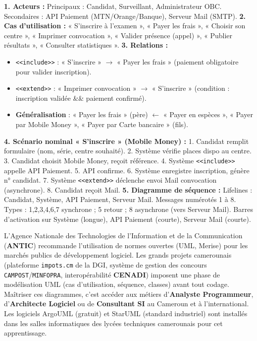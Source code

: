 \documentclass[11pt]{article}
\begin{document}
\begin{corrige}
\textbf{1. Acteurs :} Principaux : Candidat, Surveillant, Administrateur OBC. Secondaires : API Paiement (MTN/Orange/Banque), Serveur Mail (SMTP).
\textbf{2. Cas d'utilisation :} « S'inscrire à l'examen », « Payer les frais », « Choisir son centre », « Imprimer convocation », « Valider présence (appel) », « Publier résultats », « Consulter statistiques ».
\textbf{3. Relations :}
\begin{itemize}
  \item \texttt{<<include>>} : « S'inscrire » $\to$ « Payer les frais » (paiement obligatoire pour valider inscription).
  \item \texttt{<<extend>>} : « Imprimer convocation » $\to$ « S'inscrire » (condition : inscription validée \&\& paiement confirmé).
  \item \textbf{Généralisation} : « Payer les frais » (père) $\leftarrow$ « Payer en espèces », « Payer par Mobile Money », « Payer par Carte bancaire » (fils).
\end{itemize}
\textbf{4. Scénario nominal « S'inscrire » (Mobile Money) :}
1. Candidat remplit formulaire (nom, série, centre souhaité). 2. Système vérifie places dispo au centre. 3. Candidat choisit Mobile Money, reçoit référence. 4. Système \texttt{<<include>>} appelle API Paiement. 5. API confirme. 6. Système enregistre inscription, génère n° candidat. 7. Système \texttt{<<extend>>} déclenche envoi Mail convocation (asynchrone). 8. Candidat reçoit Mail.
\textbf{5. Diagramme de séquence :} Lifelines : Candidat, Système, API Paiement, Serveur Mail. Messages numérotés 1 à 8. Types : 1,2,3,4,6,7 synchrone ; 5 retour ; 8 asynchrone (vers Serveur Mail). Barres d'activation sur Système (longue), API Paiement (courte), Serveur Mail (courte).
\end{corrige}

\begin{savaistu}
L'Agence Nationale des Technologies de l'Information et de la Communication (\textbf{ANTIC}) recommande l'utilisation de normes ouvertes (UML, Merise) pour les marchés publics de développement logiciel. Les grands projets camerounais (plateforme \texttt{impots.cm} de la DGI, système de gestion des concours \texttt{CAMPOST}/\texttt{MINFOPRA}, interopérabilité \textbf{CENADI}) imposent une phase de modélisation UML (cas d'utilisation, séquence, classes) avant tout codage. Maîtriser ces diagrammes, c'est accéder aux métiers d'\textbf{Analyste Programmeur}, d'\textbf{Architecte Logiciel} ou de \textbf{Consultant SI} au Cameroun et à l'international. Les logiciels ArgoUML (gratuit) et StarUML (standard industriel) sont installés dans les salles informatiques des lycées techniques camerounais pour cet apprentissage.
\end{savaistu}
\end{document}
